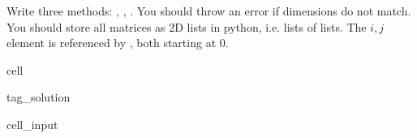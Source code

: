\documentclass[letterpaper,10pt,english]{jupyterBook}
\begin{document}
\sphinxAtStartPar
Write three methods: , , . You should throw an error
if dimensions do not match. You should store all matrices as 2D lists in python, i.e. lists of lists. The \(i,j\) element is referenced by , both starting at 0.

\begin{sphinxuseclass}{cell}
\begin{sphinxuseclass}{tag_solution}\begin{sphinxVerbatimInput}

\begin{sphinxuseclass}{cell_input}
\begin{sphinxVerbatim}[commandchars=\\\{\}]
\end{sphinxVerbatim}

\end{sphinxuseclass}\end{sphinxVerbatimInput}

\end{sphinxuseclass}
\end{sphinxuseclass}
\end{document}
